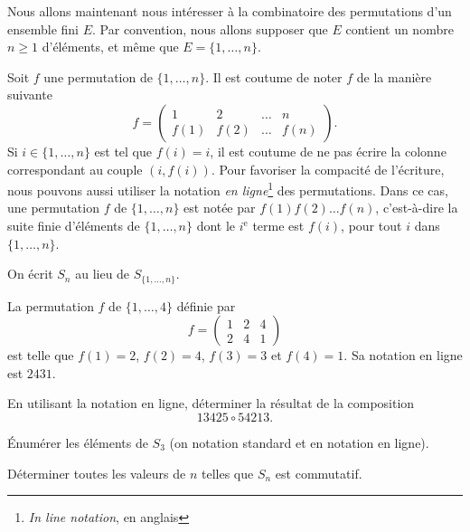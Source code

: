 \documentclass[french,course,oneside,theoremnosection]{lecture}
\begin{document}
Nous allons maintenant nous intéresser à la combinatoire des permutations d'un ensemble fini $E$. Par convention, nous allons supposer que $E$ contient un nombre $n\geq 1$ d'éléments, et même que $E=\{1, \ldots, n\}$.

\begin{notation}
Soit $f$ une permutation de $\{1, \ldots, n\}$. Il est coutume de noter $f$ de la manière suivante
\[
f=
\begin{pmatrix}
1 & 2 & \ldots & n\\
f(1) & f(2) & \ldots & f(n)
\end{pmatrix}.
\]
Si $i\in \{1, \ldots, n\}$ est tel que $f(i)=i$, il est coutume de ne pas écrire la colonne correspondant au couple $(i,f(i))$.
Pour favoriser la compacité de l'écriture, nous pouvons aussi utiliser la notation \emph{en ligne}\footnote{\emph{In line notation}, en anglais} des permutations. Dans ce cas, une permutation $f$ de $\{1, \ldots, n\}$ est notée par $f(1)f(2)\ldots f(n)$, c'est-à-dire la suite finie d'éléments de $\{1, \ldots, n\}$ dont le $i^{\text{e}}$ terme est $f(i)$, pour tout $i$ dans $\{1, \ldots, n\}$.

On écrit $S_n$ au lieu de $S_{\{1, \ldots, n\}}$.
\end{notation}

\begin{example}
La permutation $f$ de $\{1, \ldots, 4\}$ définie par
\[
f=\begin{pmatrix}
1 & 2 & 4 \\
2 & 4 & 1
\end{pmatrix}
\]
est telle que $f(1)=2$, $f(2)=4$, $f(3)=3$ et $f(4)=1$. Sa notation en ligne est $2431$.
\end{example}
\begin{exercise}
En utilisant la notation en ligne, déterminer la résultat de la composition 
\[
13425 \circ 54213.
\]
\end{exercise}

\begin{exercise}
Énumérer les éléments de $S_3$ (on notation standard et en notation en ligne).
\end{exercise}

\begin{exercise}
Déterminer toutes les valeurs de $n$ telles que $S_n$ est commutatif.
\end{exercise}
\end{document}
